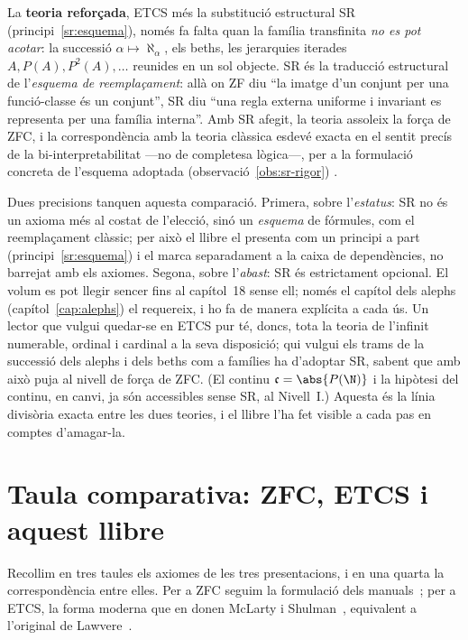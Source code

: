 La \textbf{teoria reforçada}, ETCS més la substitució estructural SR
(principi~\ref{sr:esquema}), només fa falta quan la família transfinita
\emph{no es pot acotar}: la successió \(\alpha\mapsto\aleph_\alpha\), els
beths, les jerarquies iterades \(A,P(A),P^2(A),\dots\) reunides en un sol
objecte. SR és la traducció estructural de l'\emph{esquema de reemplaçament}:
allà on ZF diu \enquote{la imatge d'un conjunt per una funció-classe és un
conjunt}, SR diu \enquote{una regla externa uniforme i invariant es
representa per una família interna}. Amb SR afegit, la teoria assoleix la
força de ZFC, i la correspondència amb la teoria clàssica esdevé exacta en el
sentit precís de la bi-interpretabilitat ---no de completesa lògica---, per a
la formulació concreta de l'esquema adoptada (observació~\ref{obs:sr-rigor})
\cite{osius1974,shulman-comparing}.

\begin{observacio}\label{obs:sr-metateoric}
Dues precisions tanquen aquesta comparació. Primera, sobre l'\emph{estatus}:
SR no és un axioma més al costat de l'elecció, sinó un \emph{esquema} de
fórmules, com el reemplaçament clàssic; per això el llibre el presenta com un
principi a part (principi~\ref{sr:esquema}) i el marca separadament a la
caixa de dependències, no barrejat amb els axiomes. Segona, sobre
l'\emph{abast}: SR és estrictament opcional. El volum es pot llegir sencer
fins al capítol~18 sense ell; només el capítol dels alephs
(capítol~\ref{cap:alephs}) el requereix, i ho fa de manera explícita a cada
ús. Un lector que vulgui quedar-se en ETCS pur té, doncs, tota la teoria de
l'infinit numerable, ordinal i cardinal a la seva disposició; qui vulgui els
trams de la successió dels alephs i dels beths com a famílies ha d'adoptar SR, sabent que amb
això puja al nivell de força de ZFC. (El continu \(\mathfrak c=\abs{P(\N)}\) i
la hipòtesi del continu, en canvi, ja són accessibles sense SR, al Nivell~I.)
Aquesta és la línia divisòria exacta entre les dues teories, i el llibre l'ha
fet visible a cada pas en comptes d'amagar-la.
\end{observacio}

\section{Taula comparativa: ZFC, ETCS i aquest llibre}\label{sec:taula-comparativa}

Recollim en tres taules els axiomes de les tres presentacions, i en una
quarta la correspondència entre elles. Per a ZFC seguim la formulació dels
manuals~\cite{jech2003,kunen2011}; per a ETCS, la forma moderna que en donen
McLarty i Shulman~\cite{mclarty-catset,shulman-comparing}, equivalent a
l'original de Lawvere~\cite{lawvere1964,lawvere-etcs-reprint}.

